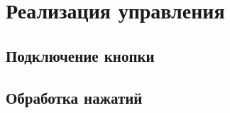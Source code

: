 \documentclass[../sparc.tex]{subfiles}
\begin{document}
\section{Реализация управления}

\subsection{Подключение кнопки}

\subsection{Обработка нажатий}
\end{document}
